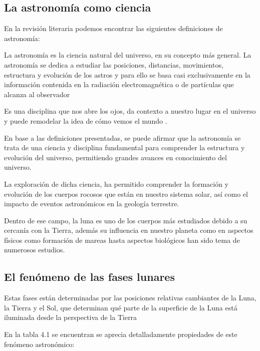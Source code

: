 \subsection*{La astronomía como ciencia}

En la revisión literaria podemos encontrar las siguientes definiciones de astronomía:

La astronomía es la ciencia natural del universo, en su
concepto más general. La astronomía
se dedica a estudiar las posiciones, distancias, movimientos, estructura y evolución de los astros y para ello se basa casi exclusivamente en la información
contenida en la radiación electromagnética o de partículas que alcanza al observador \cite{conceptos2009}


Es una disciplina que nos abre los ojos, da contexto a nuestro lugar en el universo y puede remodelar la idea de cómo vemos el mundo \cite{iau2025}.

En base a las definiciones presentadas, se puede afirmar que la astronomía se trata de una ciencia y disciplina fundamental
para comprender la estructura y evolución del universo, permitiendo grandes avances en conocimiento del universo.

La exploración de dicha ciencia, ha permitido comprender la formación y evolución de los cuerpos rocosos que están en nuestro sistema solar, así como el impacto de eventos astronómicos en la geología terrestre.

Dentro de ese campo, la luna es uno de los cuerpos más estudiados debido a su cercanía con la Tierra, además su influencia en nuestro planeta
como en aspectos físicos como formación de mareas hasta aspectos biológicos han sido tema de numerosos estudios.

\subsection*{El fenómeno de las fases lunares}


Estas fases están determinadas por las posiciones relativas cambiantes de la Luna, la Tierra y el Sol, que determinan qué parte de la superficie de la Luna está iluminada desde la perspectiva de la Tierra \cite{gullari2025}

En la tabla 4.1 se encuentran se aprecia detalladamente propiedades de este fenómeno astronómico:

